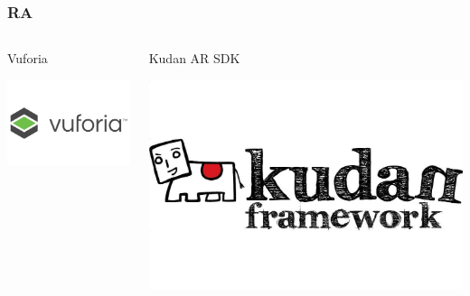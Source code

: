\begin{frame}
	\frametitle{RA}
		\begin{columns}
			\begin{column}{0.3\textwidth}
				\begin{center}					
					Vuforia 
				\end{center}
				\vspace{3mm}
				\vfill 
					\begin{center}
						\includegraphics[width=0.8\linewidth]{Images/vuforia}
					\end{center}
			\end{column}
			\begin{column}{0.3\textwidth}
				\begin{center}
				Kudan AR SDK
				\end{center}
				\vspace{3mm}
				\vfill 
					\begin{center}
						\includegraphics[width=0.8\linewidth]{Images/kudan}
					\end{center}
			\end{column}

\end{columns}
\end{frame}
